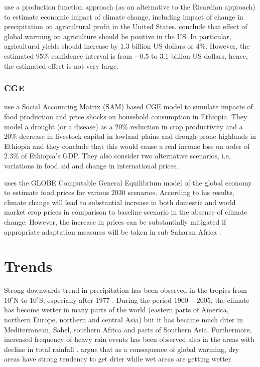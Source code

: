 \documentclass[a4paper,12pt]{article}
\begin{document}
\cite{Deschenes2007Ric} use a production function approach (as an alternative to the Ricardian approach) to estimate economic impact of climate change, including impact of change in precipitation on agricultural profit in the United States. \cite{Deschenes2007Ric} conclude that effect of global warming on agriculture should be positive in the US. In particular, agricultural yields should increase by $1.3$ billion US dollars or $4\%$. However, the estimated $95\%$ confidence interval is from $-0.5$ to $3.1$ billion US dollars, hence, the estimated effect is not very large.

\subsubsection*{CGE}

\cite{robinson2010} use a Social Accounting Matrix (SAM) based CGE model to simulate impacts of food production and price shocks on household consumption in Ethiopia. They model a drought (or a disease) as a $20\%$ reduction in crop productivity and a $20\%$ decrease in livestock capital in lowland plains and drough-prone highlands in Ethiopia and they conclude that this would cause a real income loss on order of $2.3\%$ of Ethiopia's GDP. They also consider two alternative scenarios, i.e. variations in food aid and change in international prices.

\cite{OxfamIDS} uses the GLOBE Computable General Equilibrium model of the global economy to estimate food prices for various $2030$ scenarios. According to his results, climate change will lead to substantial increase in both domestic and world market crop prices in comparison to baseline scenario in the absence of climate change. However, the increase in prices can be substantially mitigated if appropriate adaptation measures will be taken in sub-Saharan Africa \citep{OxfamIDS}.

\section*{Trends}

 Strong downwards trend in precipitation has been observed in the tropics from $10^\circ$N to $10^\circ$S, especially after $1977$ \citep{IPCCtrenberth}. During the period $1900-2005$, the climate has become wetter in many parts of the world (eastern parts of America, northern Europe, northern and central Asia) but it has became much drier in Mediterranean, Sahel, southern Africa and parts of Southern Asia. Furthermore, increased frequency of heavy rain events has been observed also in the areas with decline in total rainfall \citep{IPCCtrenberth}. \cite{Trenberth2014} argue that as a consequence of global warming, dry areas have strong tendency to get drier while wet areas are getting wetter. 
 \pagebreak


\end{document}
